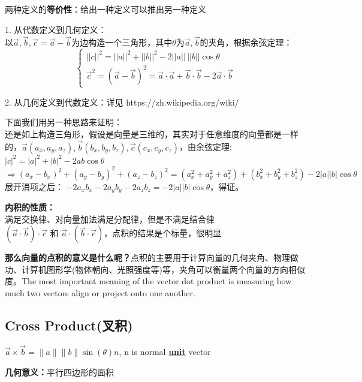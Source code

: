 \documentclass[../main.tex]{subfiles}
\begin{document}
两种定义的\textbf{等价性}：给出一种定义可以推出另一种定义

1. 从代数定义到几何定义：\\
以$\vec a, \vec b, \vec c=\vec a -\vec b$为边构造一个三角形，其中$\theta$为$\vec a, \vec b$的夹角，根据余弦定理：\\
\[
  \left \{
    \begin{array}{l}
      ||c||^2=||a||^2+||b||^2-2||a|| \, ||b|| \cos \theta\\
      \vec c^2=(\vec a - \vec b)^2=\vec a \cdot \vec a + \vec b \cdot \vec b - 2\vec a \cdot \vec b
    \end{array}
  \right.
\]

2. 从几何定义到代数定义：详见 https://zh.wikipedia.org/wiki/%

下面我们用另一种思路来证明：\\
还是如上构造三角形，假设是向量是三维的，其实对于任意维度的向量都是一样的，$\vec a(a_x, a_y, a_z), \vec b(b_x, b_y, b_z), \vec c(c_x, c_y, c_z)$，由余弦定理:\\
$|c|^2=|a|^2+|b|^2-2ab\cos \theta $\\
$\Rightarrow (a_x-b_x)^2+(a_y-b_y)^2+(a_z-b_z)^2=(a_x^2+a_y^2+a_z^2)+(b_x^2+b_y^2+b_z^2)-2|a| |b|\cos \theta$\\
展开消项之后：
$-2a_xb_x-2a_yb_y-2a_zb_z=-2|a||b|\cos \theta$，得证。

\textbf{内积的性质：}\\
满足交换律、对向量加法满足分配律，但是不满足结合律\\
$(\vec a \cdot \vec b)\cdot \vec c$ 和 $\vec a \cdot (\vec b \cdot \vec c)$，点积的结果是个标量，很明显

\textbf{那么向量的点积的意义是什么呢？}点积的主要用于计算向量的几何夹角、物理做功、计算机图形学(物体朝向、光照强度等)等，夹角可以衡量两个向量的方向相似度。The most important meaning of the vector dot product is measuring how much two vectors align or project onto one another.

\subsection{Cross Product(叉积)}
$\vec{a} \times \vec{b} = \|a\|\|b\| \sin(\theta)n$, n is normal \underline{\textbf{unit}} vector

\textbf{几何意义：}平行四边形的面积
\end{document}
